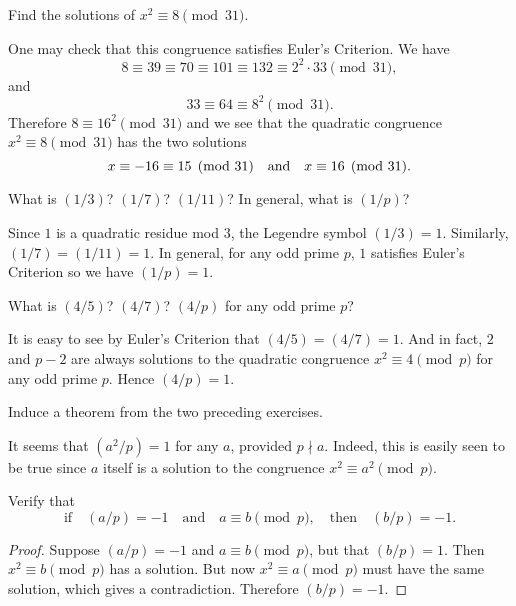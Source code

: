 Find the solutions of $x^2\equiv8\pmod{31}$.
\begin{solution}
  One may check that this congruence satisfies Euler's Criterion. We
  have
  \begin{equation*}
    8\equiv39\equiv70\equiv101\equiv132
    \equiv2^2\cdot33\pmod{31},
  \end{equation*}
  and
  \begin{equation*}
    33\equiv64\equiv8^2\pmod{31}.
  \end{equation*}
  Therefore $8\equiv16^2\pmod{31}$ and we see that the quadratic
  congruence $x^2\equiv8\pmod{31}$ has the two solutions
  \begin{equation*}
    x\equiv-16\equiv15\pmod{31}
    \quad\text{and}\quad
    x\equiv16\pmod{31}. \qedhere
  \end{equation*}
\end{solution}

 What is $(1/3)$? $(1/7)$? $(1/11)$? In general, what is
$(1/p)$?
\begin{solution}
  Since $1$ is a quadratic residue mod $3$, the Legendre symbol
  $(1/3) = 1$. Similarly, $(1/7) = (1/11) = 1$. In general, for any
  odd prime $p$, $1$ satisfies Euler's Criterion so we have
  $(1/p) = 1$.
\end{solution}

 What is $(4/5)$? $(4/7)$? $(4/p)$ for any odd prime $p$?
\begin{solution}
  It is easy to see by Euler's Criterion that $(4/5) = (4/7) = 1$. And
  in fact, $2$ and $p - 2$ are always solutions to the quadratic
  congruence $x^2\equiv4\pmod{p}$ for any odd prime $p$. Hence
  $(4/p) = 1$.
\end{solution}

 Induce a theorem from the two preceding exercises.
\begin{solution}
  It seems that $(a^2/p) = 1$ for any $a$, provided $p\nmid
  a$. Indeed, this is easily seen to be true since $a$ itself is a
  solution to the congruence $x^2\equiv a^2\pmod{p}$.
\end{solution}

 Verify that
\begin{equation*}
  \text{if}\quad
  (a/p) = -1
  \quad\text{and}\quad
  a\equiv b\pmod{p},
  \quad\text{then}\quad
  (b/p) = -1.
\end{equation*}
\begin{proof}
  Suppose $(a/p) = -1$ and $a\equiv b\pmod{p}$, but that $(b/p) =
  1$. Then $x^2\equiv b\pmod{p}$ has a solution. But now
  $x^2\equiv a\pmod{p}$ must have the same solution, which gives a
  contradiction. Therefore $(b/p) = -1$.
\end{proof}
